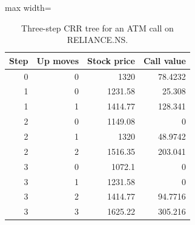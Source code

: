 \begin{table}
\centering
\small
\caption{Three-step CRR tree for an ATM call on RELIANCE.NS.}
\label{tab:example_tree_n3}
\begin{adjustbox}{max width=\textwidth}
\begin{tabular}{rrrr}
\toprule
Step & Up moves & Stock price & Call value \\
\midrule
0 & 0 & 1320 & 78.4232 \\
1 & 0 & 1231.58 & 25.308 \\
1 & 1 & 1414.77 & 128.341 \\
2 & 0 & 1149.08 & 0 \\
2 & 1 & 1320 & 48.9742 \\
2 & 2 & 1516.35 & 203.041 \\
3 & 0 & 1072.1 & 0 \\
3 & 1 & 1231.58 & 0 \\
3 & 2 & 1414.77 & 94.7716 \\
3 & 3 & 1625.22 & 305.216 \\
\bottomrule
\end{tabular}
\end{adjustbox}
\end{table}
